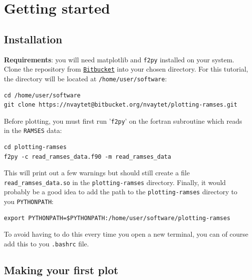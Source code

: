 \documentclass[12pt]{article}
\begin{document}
\section{Getting started}

\subsection{Installation}

\textbf{Requirements}: you will need matplotlib and \texttt{f2py} installed on your system.\\
Clone the repository from \href{https://bitbucket.org/nvaytet/plotting-ramses}{\texttt{Bitbucket}} into your chosen directory. For this tutorial, the directory will be located at \texttt{/home/user/software}:
\begin{lstlisting}
cd /home/user/software
git clone https://nvaytet@bitbucket.org/nvaytet/plotting-ramses.git
\end{lstlisting}
Before plotting, you must first run '\texttt{f2py}' on the fortran subroutine which reads in the \texttt{RAMSES} data:
\begin{lstlisting}
cd plotting-ramses
f2py -c read_ramses_data.f90 -m read_ramses_data
\end{lstlisting}
This will print out a few warnings but should still create a file \texttt{read\_ramses\_data.so} in the \texttt{plotting-ramses} directory.
Finally, it would probably be a good idea to add the path to the \texttt{plotting-ramses} directory to you \texttt{PYTHONPATH}:
\begin{lstlisting}
export PYTHONPATH=$PYTHONPATH:/home/user/software/plotting-ramses
\end{lstlisting}
To avoid having to do this every time you open a new terminal, you can of course add this to you \texttt{.bashrc} file.

\subsection{Making your first plot}
\end{document}

